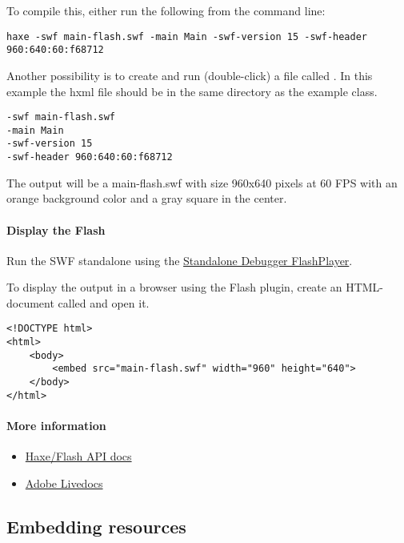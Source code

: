 To compile this, either run the following from the command line:

\begin{lstlisting}
haxe -swf main-flash.swf -main Main -swf-version 15 -swf-header 960:640:60:f68712
\end{lstlisting}

Another possibility is to create and run (double-click) a file called . In this example the hxml file should be in the same directory as the example class.

\begin{lstlisting}
-swf main-flash.swf
-main Main
-swf-version 15
-swf-header 960:640:60:f68712
\end{lstlisting}

The output will be a main-flash.swf with size 960x640 pixels at 60 FPS with an orange background color and a gray square in the center.

\paragraph{Display the Flash}

Run the SWF standalone using the \href{https://www.adobe.com/support/flashplayer/downloads.html}{Standalone Debugger FlashPlayer}. 

To display the output in a browser using the Flash plugin, create an HTML-document called  and open it.

\begin{lstlisting}
<!DOCTYPE html>
<html>
	<body>
		<embed src="main-flash.swf" width="960" height="640">
	</body>
</html>
\end{lstlisting}

\paragraph{More information}

\begin{itemize}
	\item \href{https://api.haxe.org/flash/}{Haxe/Flash API docs}
	\item \href{http://help.adobe.com/en_US/FlashPlatform/reference/actionscript/3/}{Adobe Livedocs}
\end{itemize}

\subsection{Embedding resources}
\label{target-flash-resources}

